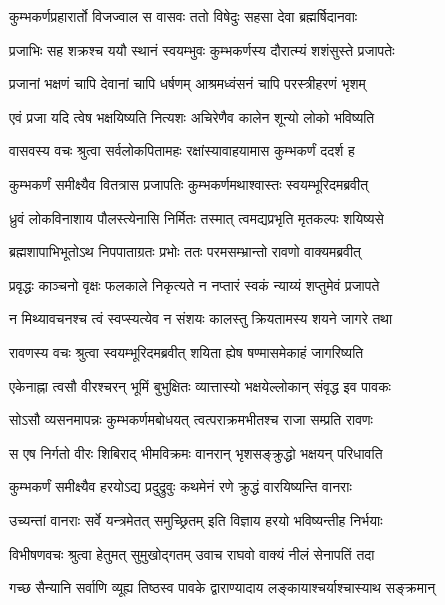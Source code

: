 \twolineshloka
{कुम्भकर्णप्रहारार्तो विजज्वाल स वासवः}
{ततो विषेदुः सहसा देवा ब्रह्मर्षिदानवाः} %

\twolineshloka
{प्रजाभिः सह शक्रश्च ययौ स्थानं स्वयम्भुवः}
{कुम्भकर्णस्य दौरात्म्यं शशंसुस्ते प्रजापतेः} %

\twolineshloka
{प्रजानां भक्षणं चापि देवानां चापि धर्षणम्}
{आश्रमध्वंसनं चापि परस्त्रीहरणं भृशम्} %

\twolineshloka
{एवं प्रजा यदि त्वेष भक्षयिष्यति नित्यशः}
{अचिरेणैव कालेन शून्यो लोको भविष्यति} %

\twolineshloka
{वासवस्य वचः श्रुत्वा सर्वलोकपितामहः}
{रक्षांस्यावाहयामास कुम्भकर्णं ददर्श ह} %

\twolineshloka
{कुम्भकर्णं समीक्ष्यैव वितत्रास प्रजापतिः}
{कुम्भकर्णमथाश्वास्तः स्वयम्भूरिदमब्रवीत्} %

\twolineshloka
{ध्रुवं लोकविनाशाय पौलस्त्येनासि निर्मितः}
{तस्मात् त्वमद्यप्रभृति मृतकल्पः शयिष्यसे} %

\twolineshloka
{ब्रह्मशापाभिभूतोऽथ निपपाताग्रतः प्रभोः}
{ततः परमसम्भ्रान्तो रावणो वाक्यमब्रवीत्} %

\twolineshloka
{प्रवृद्धः काञ्चनो वृक्षः फलकाले निकृत्यते}
{न नप्तारं स्वकं न्याय्यं शप्तुमेवं प्रजापते} %

\twolineshloka
{न मिथ्यावचनश्च त्वं स्वप्स्यत्येव न संशयः}
{कालस्तु क्रियतामस्य शयने जागरे तथा} %

\twolineshloka
{रावणस्य वचः श्रुत्वा स्वयम्भूरिदमब्रवीत्}
{शयिता ह्येष षण्मासमेकाहं जागरिष्यति} %

\twolineshloka
{एकेनाह्ना त्वसौ वीरश्चरन् भूमिं बुभुक्षितः}
{व्यात्तास्यो भक्षयेल्लोकान् संवृद्ध इव पावकः} %

\twolineshloka
{सोऽसौ व्यसनमापन्नः कुम्भकर्णमबोधयत्}
{त्वत्पराक्रमभीतश्च राजा सम्प्रति रावणः} %

\twolineshloka
{स एष निर्गतो वीरः शिबिराद् भीमविक्रमः}
{वानरान् भृशसङ्क्रुद्धो भक्षयन् परिधावति} %

\twolineshloka
{कुम्भकर्णं समीक्ष्यैव हरयोऽद्य प्रदुद्रुवुः}
{कथमेनं रणे क्रुद्धं वारयिष्यन्ति वानराः} %

\twolineshloka
{उच्यन्तां वानराः सर्वे यन्त्रमेतत् समुच्छ्रितम्}
{इति विज्ञाय हरयो भविष्यन्तीह निर्भयाः} %

\twolineshloka
{विभीषणवचः श्रुत्वा हेतुमत् सुमुखोद्गतम्}
{उवाच राघवो वाक्यं नीलं सेनापतिं तदा} %

\twolineshloka
{गच्छ सैन्यानि सर्वाणि व्यूह्य तिष्ठस्व पावके}
{द्वाराण्यादाय लङ्कायाश्चर्याश्चास्याथ सङ्क्रमान्} %

